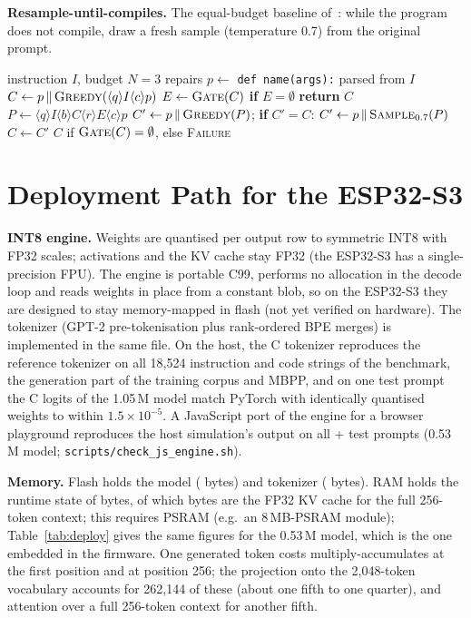 \textbf{Resample-until-compiles.} The equal-budget baseline of~\cite{olausson2024selfrepair}: while the program does not compile, draw a fresh sample (temperature 0.7) from the original prompt.

\begin{algorithm}[t]\caption{Signature anchoring + REF}\label{alg:ref}
\begin{algorithmic}[1]
\Require instruction $I$, budget $N=3$ repairs
\State $p \gets$ \texttt{def name(args):} parsed from $I$ 
\State $C \gets p \,\|\, \textsc{Greedy}(\langle q\rangle I \langle c\rangle p)$
  \State $E \gets \textsc{Gate}(C)$ 
  \State \textbf{if} $E=\emptyset$ \textbf{return} $C$
  \State $P \gets \langle q\rangle I \langle b\rangle C \langle r\rangle E \langle c\rangle p$
  \State $C' \gets p \,\|\, \textsc{Greedy}(P)$; \textbf{if} $C'=C$: $C' \gets p \,\|\, \textsc{Sample}_{0.7}(P)$
  \State $C \gets C'$
\EndFor
\State \Return $C$ if $\textsc{Gate}(C)=\emptyset$, else \textsc{Failure}
\end{algorithmic}\end{algorithm}

\section{Deployment Path for the ESP32-S3}
\textbf{INT8 engine.} Weights are quantised per output row to symmetric INT8 with FP32 scales; activations and the KV cache stay FP32 (the ESP32-S3 has a single-precision FPU). The engine is portable C99, performs no allocation in the decode loop and reads weights in place from a constant blob, so on the ESP32-S3 they are designed to stay memory-mapped in flash (not yet verified on hardware). The tokenizer (GPT-2 pre-tokenisation plus rank-ordered BPE merges) is implemented in the same file. On the host, the C tokenizer reproduces the reference tokenizer on all 18{,}524 instruction and code strings of the benchmark, the generation part of the training corpus and MBPP, and on one test prompt the C logits of the 1.05\,M model match PyTorch with identically quantised weights to within $1.5\times10^{-5}$. A JavaScript port of the engine for a browser playground reproduces the host simulation's output on all \ntestid{}+\ntestood{} test prompts (0.53\,M model; \texttt{scripts/check\_js\_engine.sh}).

\textbf{Memory.} Flash holds the model (\depintmodelbytes{} bytes) and tokenizer (\deptokenizerbytes{} bytes). RAM holds the runtime state of \depstatebytes{} bytes, of which \depkvcachebytes{} bytes are the FP32 KV cache for the full 256-token context; this requires PSRAM (e.g.\ an 8\,MB-PSRAM module); Table~\ref{tab:deploy} gives the same figures for the 0.53\,M model, which is the one embedded in the firmware. One generated token costs \depmacsfirst{} multiply-accumulates at the first position and \depmacslast{} at position 256; the projection onto the 2{,}048-token vocabulary accounts for 262{,}144 of these (about one fifth to one quarter), and attention over a full 256-token context for another fifth.

